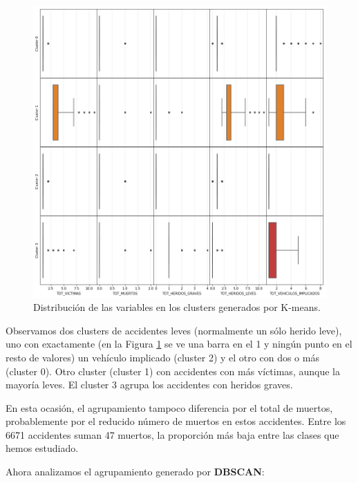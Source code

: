 \documentclass[oneside]{book}
\begin{document}
\begin{figure}[H]
  \centering
  \includegraphics[width=130mm]{figures/accidentes/k-means3distribution}
  \caption{Distribución de las variables en los clusters generados por
    K-means.}
  \label{fig:k-means3distribution}
\end{figure}

Observamos dos clusters de accidentes leves (normalmente un sólo
herido leve), uno con exactamente (en la Figura
\ref{fig:k-means3distribution} se ve una barra en el 1 y ningún punto
en el resto de valores) un vehículo implicado (cluster 2) y el otro
con dos o más (cluster 0). Otro cluster (cluster 1) con accidentes con
más víctimas, aunque la mayoría leves. El cluster 3 agrupa los
accidentes con heridos graves.

En esta ocasión, el agrupamiento tampoco diferencia por el total de
muertos, probablemente por el reducido número de muertos en estos
accidentes. Entre los 6671 accidentes suman 47 muertos, la proporción
más baja entre las clases que hemos estudiado.

Ahora analizamos el agrupamiento generado por \textbf{DBSCAN}:
\end{document}
